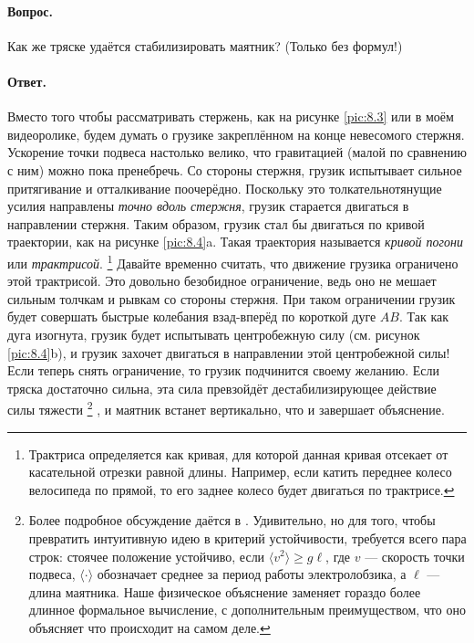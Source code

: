 \paragraph{Вопрос.}
Как же тряске удаётся стабилизировать маятник?
(Только без формул!)

\paragraph{Ответ.}
Вместо того чтобы рассматривать стержень, как на рисунке
\ref{pic:8.3} или в моём видеоролике, будем думать о грузике закреплённом на конце невесомого стержня.
Ускорение точки подвеса настолько велико, что гравитацией (малой по сравнению с ним) можно пока пренебречь.
Со стороны стержня, грузик испытывает сильное притягивание и отталкивание поочерёдно.
Поскольку это толкательнотянущие усилия направлены \emph{точно вдоль стержня}, грузик старается двигаться в направлении стержня.
Таким образом, грузик стал бы двигаться по кривой траектории, как на рисунке \ref{pic:8.4}a.
Такая траектория называется \emph{кривой погони} или \emph{трактрисой}.%
\footnote{Трактриса определяется как кривая, для которой данная кривая отсекает от касательной отрезки равной длины.
Например, если катить переднее колесо велосипеда по прямой, то его заднее колесо будет двигаться по трактрисе.}
Давайте временно считать, что движение грузика ограничено этой трактрисой.
Это довольно безобидное ограничение, ведь оно не мешает сильным толчкам и рывкам со стороны стержня.
При таком ограничении грузик будет совершать быстрые колебания взад-вперёд по короткой дуге $AB$.
Так как дуга изогнута, грузик будет испытывать центробежную силу (см. рисунок \ref{pic:8.4}b), и грузик захочет двигаться в направлении этой центробежной силы!
Если теперь снять ограничение, то грузик подчинится своему желанию.
Если тряска достаточно сильна, эта сила превзойдёт дестабилизирующее действие силы тяжести%
\footnote{Более подробное обсуждение даётся в \cite[стр. 158]{levi1999}.
Удивительно, но для того, чтобы превратить интуитивную идею в критерий устойчивости, требуется всего пара строк: стоячее положение устойчиво, если  $
\langle v^2 \rangle \ge g \ell$,
где $v$ --- скорость точки подвеса, $\langle \cdot \rangle$ обозначает среднее за период работы электролобзика, а $\ell$ --- длина маятника.
Наше физическое объяснение заменяет гораздо более длинное формальное вычисление, с дополнительным преимуществом, что оно объясняет что происходит на самом деле.}%
, и маятник встанет вертикально, что и завершает объяснение.

